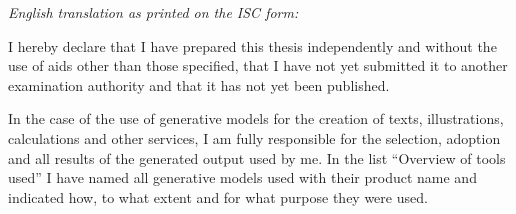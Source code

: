 \documentclass[12pt, a4paper]{article}
\theoremstyle{definition}
\begin{document}
\vspace{2.5cm}

\noindent
{\small
\textit{English translation as printed on the ISC form:}

\noindent
I hereby declare that I have prepared this thesis independently and without the use of aids other than those specified, that I have not yet submitted it to another examination authority and that it has not yet been published.

\noindent
In the case of the use of generative models for the creation of texts, illustrations, calculations and other services, I am fully responsible for the selection, adoption and all results of the generated output used by me. In the list ``Overview of tools used'' I have named all generative models used with their product name and indicated how, to what extent and for what purpose they were used.
}
\end{document}
